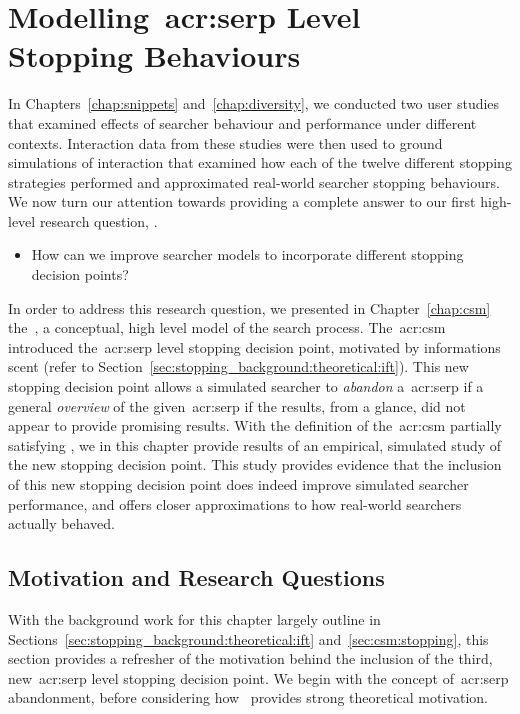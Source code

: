 
\chapter[Modelling SERP Level Stopping Behaviours]{Modelling~\gls{acr:serp} Level\\Stopping Behaviours}\label{chap:serp}
In Chapters~\ref{chap:snippets} and~\ref{chap:diversity}, we conducted two user studies that examined effects of searcher behaviour and performance under different contexts. Interaction data from these studies were then used to ground simulations of interaction that examined how each of the twelve different stopping strategies performed and approximated real-world searcher stopping behaviours. We now turn our attention towards providing a complete answer to our first high-level research question, .

\begin{itemize}
    \item[]{ How can we improve searcher models to incorporate different stopping decision points?}
\end{itemize}

In order to address this research question, we presented in Chapter~\ref{chap:csm} the~, a conceptual, high level model of the search process. The~\gls{acr:csm} introduced the~\gls{acr:serp} level stopping decision point, motivated by informations scent (refer to Section~\ref{sec:stopping_background:theoretical:ift}). This new stopping decision point allows a simulated searcher to \emph{abandon} a~\gls{acr:serp} if a general \emph{overview} of the given~\gls{acr:serp} if the results, from a glance, did not appear to provide promising results. With the definition of the~\gls{acr:csm} partially satisfying , we in this chapter provide results of an empirical, simulated study of the new stopping decision point. This study provides evidence that the inclusion of this new stopping decision point does indeed improve simulated searcher performance, and offers closer approximations to how real-world searchers actually behaved.

\section{Motivation and Research Questions}\label{sec:serp:background}
With the background work for this chapter largely outline in Sections~\ref{sec:stopping_background:theoretical:ift} and~\ref{sec:csm:stopping}, this section provides a refresher of the motivation behind the inclusion of the third, new~\gls{acr:serp} level stopping decision point. We begin with the concept of~\gls{acr:serp} abandonment, before considering how~ provides strong theoretical motivation.

